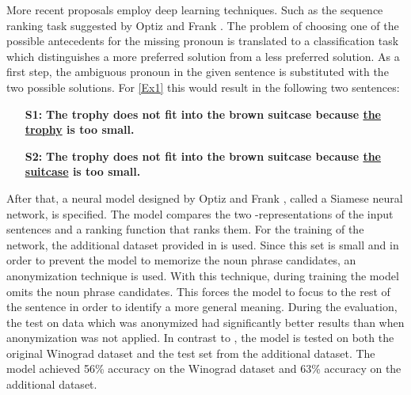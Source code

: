 More recent proposals employ deep learning techniques. Such as the sequence ranking task suggested by Optiz and Frank \cite{W18-4105}. The problem of choosing one of the possible antecedents for the missing pronoun is translated to a classification task which distinguishes a more preferred solution from a less preferred solution. As a first step, the ambiguous pronoun in the given sentence is substituted with the two possible solutions.  
For \ref{Ex1} this would result in the following two sentences: 

\begin{itemize}
	\item [\textbf{S1:}] \textbf{The trophy does not fit into the brown suitcase because \underline{the trophy} is too small.}
	\item[\textbf{S2:}] \textbf{The trophy does not fit into the brown suitcase because \underline{the suitcase} is too small.}
\end{itemize} 

After that, a neural model designed by Optiz and Frank \cite{W18-4105}, called a Siamese neural network, is specified. The model compares the two -representations of the input sentences and a ranking function that ranks them. 
For the training of the network, the additional dataset provided in \cite{DBLP:conf/emnlp/RahmanN12} is used. Since this set is small and in order to prevent the model to memorize the noun phrase candidates, an anonymization technique is used. With this technique, during training the model omits the noun phrase candidates. This forces the model to focus to the rest of the sentence in order to identify a more general meaning. During the evaluation, the test on data which was anonymized had significantly better results than when anonymization was not applied. In contrast to \cite{DBLP:conf/emnlp/RahmanN12}, the model is tested on both the original Winograd dataset and the test set from the additional dataset. The model achieved 56\% accuracy on the Winograd dataset and 63\% accuracy on the additional dataset.


